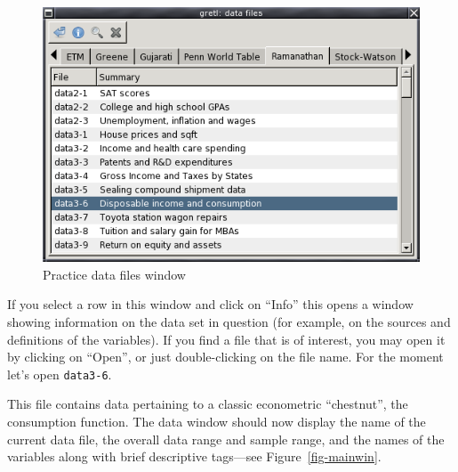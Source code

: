 \begin{figure}[htbp]
  \begin{center}
    \includegraphics[scale=0.5]{figures/datafiles}
  \end{center}
  \caption{Practice data files window}
  \label{fig-datafiles}
\end{figure}

If you select a row in this window and click on ``Info'' this opens a
window showing information on the data set in question (for example,
on the sources and definitions of the variables).  If you find a file
that is of interest, you may open it by clicking on ``Open'', or just
double-clicking on the file name. For the moment let's open
\verb+data3-6+.  


This file contains data pertaining to a classic
econometric ``chestnut'', the consumption function.  The data window
should now display the name of the current data file, the overall data
range and sample range, and the names of the variables along with
brief descriptive tags---see Figure~\ref{fig-mainwin}.
    
